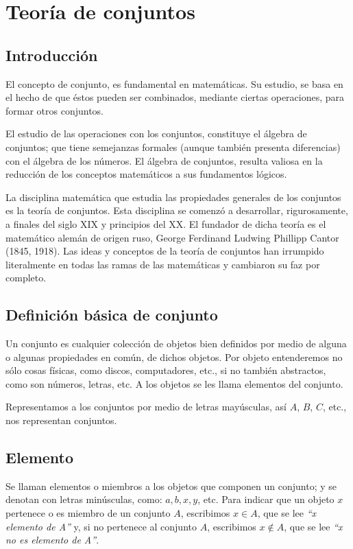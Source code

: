 \section*{Teoría de conjuntos}

\subsection*{Introducción}

El concepto de conjunto, es fundamental en matemáticas. Su estudio, se basa en
el hecho de que éstos pueden ser combinados, mediante ciertas operaciones, para
formar otros conjuntos. 

El estudio de las operaciones con los conjuntos, constituye el álgebra de
conjuntos; que tiene semejanzas formales (aunque también presenta diferencias)
con el álgebra de los números. El álgebra de conjuntos, resulta valiosa en la
reducción de los conceptos matemáticos a sus fundamentos lógicos. 

La disciplina matemática que estudia las propiedades generales de los conjuntos
es la teoría de conjuntos. Esta disciplina se comenzó a desarrollar,
rigurosamente, a finales del siglo XIX y principios del XX. El fundador de dicha
teoría es el matemático alemán de origen ruso, George Ferdinand Ludwing
Phillipp Cantor (1845, 1918). Las ideas y conceptos de la teoría de conjuntos
han irrumpido literalmente en todas las ramas de las matemáticas y cambiaron su
faz por completo.

\subsection*{Definición básica de conjunto}

Un conjunto es cualquier colección de objetos bien definidos por medio de alguna
o algunas propiedades en común, de dichos objetos. Por objeto entenderemos no
sólo cosas físicas, como discos, computadores, etc., si no también abstractos,
como son números, letras, etc. A los objetos se les llama elementos del
conjunto.

Representamos a los conjuntos por medio de letras mayúsculas, así $A$, $B$, $C$,
etc., nos representan conjuntos.

\subsection*{Elemento}

Se llaman elementos o miembros a los objetos que componen un conjunto; y se
denotan con letras minúsculas, como: $a, b, x, y$, etc. Para indicar que un
objeto $x$ pertenece o es miembro de un conjunto $A$, escribimos $x \in A$, que
se lee \textit{“x elemento de A”} y, si no pertenece al conjunto $A$, escribimos
$x \notin A$, que se lee \textit{“x no es elemento de A”}.

